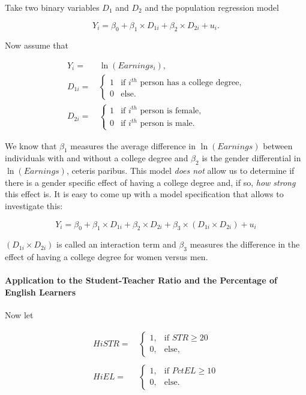 \documentclass[
]{article}
\begin{document}
Take two binary variables \(D_1\) and \(D_2\) and the population
regression model

\[ Y_i = \beta_0 + \beta_1 \times D_{1i} + \beta_2 \times D_{2i} + u_i. \]

Now assume that

\begin{align*}
  Y_i=& \, \ln(Earnings_i),\\
  D_{1i} =& \,
   \begin{cases}
      1 & \text{if $i^{th}$ person has a college degree,} \\
      0 & \text{else}.
    \end{cases} \\
  D_{2i} =& \, 
    \begin{cases}
      1 & \text{if $i^{th}$ person is female,} \\
      0 & \text{if $i^{th}$ person is male}.
    \end{cases}
\end{align*}

We know that \(\beta_1\) measures the average difference in
\(\ln(Earnings)\) between individuals with and without a college degree
and \(\beta_2\) is the gender differential in \(\ln(Earnings)\), ceteris
paribus. This model \emph{does not} allow us to determine if there is a
gender specific effect of having a college degree and, if so, \emph{how
strong} this effect is. It is easy to come up with a model specification
that allows to investigate this:

\[ Y_i = \beta_0 + \beta_1 \times D_{1i} + \beta_2 \times D_{2i} + \beta_3 \times (D_{1i} \times D_{2i}) + u_i \]

\((D_{1i} \times D_{2i})\) is called an interaction term and \(\beta_3\)
measures the difference in the effect of having a college degree for
women versus men.

\hypertarget{application-to-the-student-teacher-ratio-and-the-percentage-of-english-learners}{%
\paragraph*{Application to the Student-Teacher Ratio and the Percentage
of English
Learners}\label{application-to-the-student-teacher-ratio-and-the-percentage-of-english-learners}}

Now let

\begin{align*}
  HiSTR =& \, 
    \begin{cases}
      1, & \text{if $STR \geq 20$} \\
      0, & \text{else},
    \end{cases} \\
  \\
  HiEL =& \,
    \begin{cases}
      1, & \text{if $PctEL \geq 10$} \\
      0, & \text{else}.
    \end{cases}
\end{align*}
\end{document}
